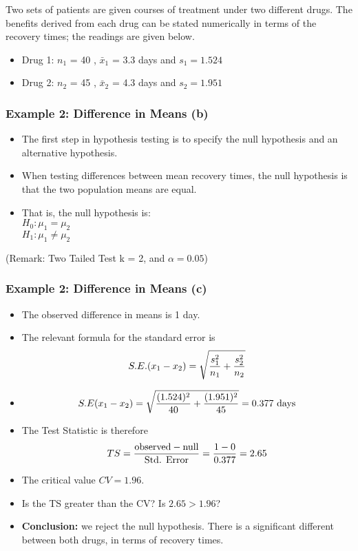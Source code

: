 
Two sets of patients are given courses of treatment under two different drugs. The benefits
derived from each drug can be stated numerically in terms of the recovery times; the readings are given below.

\begin{itemize}
\item Drug 1:  $n_1$ = 40 , $\bar{x}_1$ = 3.3 days and $s_1 = 1.524$
\item Drug 2:  $n_2$ = 45 , $\bar{x}_2$ = 4.3 days and $s_2 = 1.951 $
\end{itemize}


\frametitle{Example 2: Difference in Means (b) }
\begin{itemize}
\item
The first step in hypothesis testing is to specify the null hypothesis and an alternative hypothesis.
\item When testing differences between mean recovery times, the null hypothesis is that the two population means are equal.
\item That is, the null hypothesis is:\\
$H_0: \mu_1 = \mu_2$\\
$H_1: \mu_1 \neq \mu_2$\\
\end{itemize}
(Remark: Two Tailed Test k = 2, and $\alpha = 0.05$)

\frametitle{Example 2: Difference in Means (c) }
\begin{itemize}
\item The observed difference in means is 1 day.
\item The relevant formula for the standard error is \[ S.E.(x_1 - x_2) = \sqrt{{s^2_1\over n_1}+{s^2_2 \over n_2}} \]
\item  \[ S.E(x_1 - x_2) = \sqrt{{(1.524)^2 \over 40}+{(1.951)^2 \over 45}}  = 0.377\mbox{ days} \]
\end{itemize}

\begin{itemize}
\item The Test Statistic is therefore
\[ TS = {\mbox{observed} - \mbox{null} \over \mbox{Std. Error}}  = {1 - 0 \over 0.377 } = 2.65 \]
\item The critical value $CV = 1.96$.
\item Is the TS greater than the CV? Is $2.65 > 1.96$?

\item \textbf{Conclusion:} we reject the null hypothesis. There is a significant different between both drugs, in terms of recovery times.

\end{itemize}


